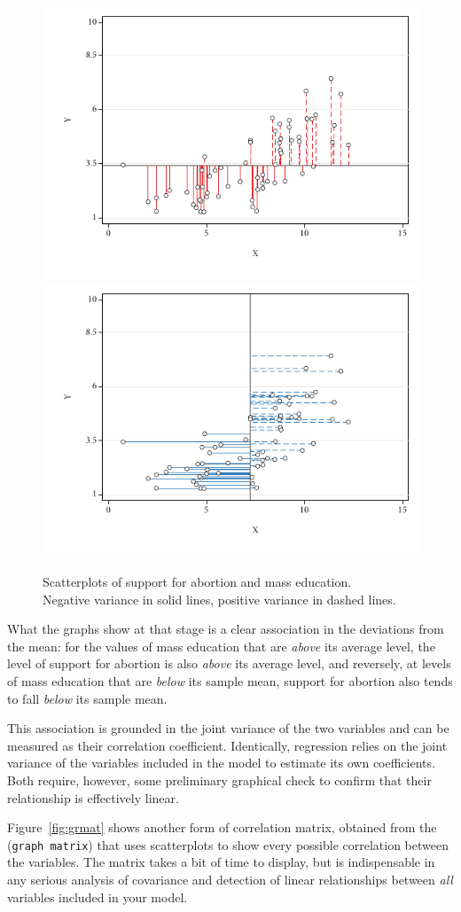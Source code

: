   \begin{figure}[htp]
  	\centering
  	\includegraphics[width=.48\textwidth]{images/abortion_sc_yvariance.pdf}
  	\includegraphics[width=.48\textwidth]{images/abortion_sc_xvariance.pdf}

  	\caption[Variance in two variables]{\label{fig:correlation_variance}
  	Scatterplots of support for abortion and mass education.\\
  	\mlines{} Negative variance in solid lines, positive variance in dashed lines. }
  \end{figure}%

  What the graphs show at that stage is a clear association in the deviations from the mean: for the values of mass education that are \emph{above} its average level, the level of support for abortion is also \emph{above} its average level, and reversely, at levels of mass education that are \emph{below} its sample mean, support for abortion also tends to fall \emph{below} its sample mean.%

  This association is grounded in the joint variance of the two variables and can be measured as their correlation coefficient. Identically, regression relies on the joint variance of the variables included in the model to estimate its own coefficients. Both require, however, some preliminary graphical check to confirm that their relationship is effectively linear.%

Figure~\ref{fig:grmat} shows another form of correlation matrix, obtained from the  (\texttt{graph matrix}) that uses scatterplots to show every possible correlation between the variables. The matrix takes a bit of time to display, but is indispensable in any serious analysis of covariance and detection of linear relationships between \emph{all} variables included in your model. 


